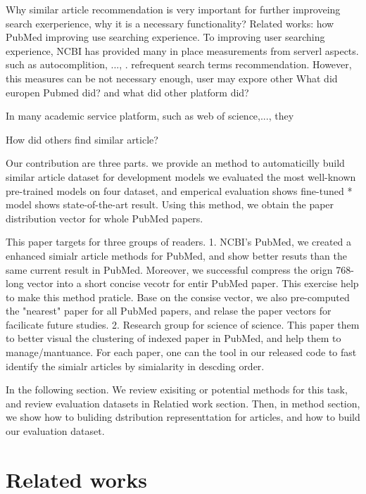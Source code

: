 \documentclass[11pt]{article}
\begin{document}
    Why similar article recommendation is very important for further improveing search exerperience, why it is a necessary functionality?
    Related works: how PubMed improving use searching experience. To improving user searching experience, NCBI has provided many in place measurements from serverl aspects.
    such as autocomplition, ..., . refrequent search terms recommendation. However, this measures can be not necessary enough, user may expore other
    What did europen Pubmed did? and what did other platform did?

    In many academic service platform, such as web of science,..., they

    How did others find similar article?

    Our contribution are three parts.
    we provide an method to automaticilly build similar article dataset for development models
    we evaluated the most well-known pre-trained models on four dataset, and emperical evaluation shows fine-tuned * model shows state-of-the-art result.
    Using this method, we obtain the paper distribution vector for whole PubMed papers.

    This paper targets for three groups of readers. 1. NCBI's PubMed, we created a enhanced simialr article methods for PubMed, and show better resuts than the same current result in PubMed. Moreover, we successful compress the orign 768-long vector into a short concise vecotr for entir PubMed paper.
    This exercise help to make this method praticle. Base on the consise vector, we also pre-computed the "nearest" paper for all PubMed papers, and relase the paper vectors for facilicate future studies.
    2. Research group for science of science. This paper them to better visual the clustering of indexed paper in PubMed, and help them to manage/mantuance. For each paper, one can the tool in our released code to fast identify the simialr articles by simialarity in descding order.

    In the following section. We review exisiting or potential methods for this task, and review evaluation datasets in Relatied work section. Then, in method section, we show how to buliding dstribution representtation for articles, and how to build our evaluation dataset.

    \section{Related works}
\end{document}
